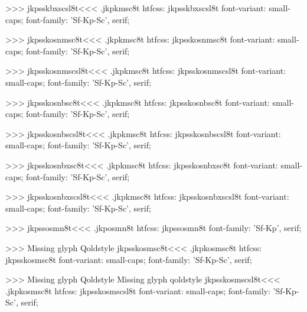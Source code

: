>>>
\<jkpsskbxscsl8t\><<<
.jkpkmsc8t
htfcss:  jkpsskbxscsl8t  font-variant: small-caps; font-family: 'Sf-Kp-Sc', serif;

>>>
\<jkpsskosnmsc8t\><<<
.jkpkmsc8t
htfcss:  jkpsskosnmsc8t  font-variant: small-caps; font-family: 'Sf-Kp-Sc', serif;

>>>
\<jkpsskosnmscsl8t\><<<
.jkpkmsc8t
htfcss:  jkpsskosnmscsl8t  font-variant: small-caps; font-family: 'Sf-Kp-Sc', serif;

>>>
\<jkpsskosnbsc8t\><<<
.jkpkmsc8t
htfcss:  jkpsskosnbsc8t  font-variant: small-caps; font-family: 'Sf-Kp-Sc', serif;

>>>
\<jkpsskosnbscsl8t\><<<
.jkpkmsc8t
htfcss:  jkpsskosnbscsl8t  font-variant: small-caps; font-family: 'Sf-Kp-Sc', serif;

>>>
\<jkpsskosnbxsc8t\><<<
.jkpkmsc8t
htfcss:  jkpsskosnbxsc8t  font-variant: small-caps; font-family: 'Sf-Kp-Sc', serif;

>>>
\<jkpsskosnbxscsl8t\><<<
.jkpkmsc8t
htfcss:  jkpsskosnbxscsl8t  font-variant: small-caps; font-family: 'Sf-Kp-Sc', serif;

>>>
\<jkpssosmn8t\><<<
.jkposmn8t
htfcss:  jkpssosmn8t  font-family: 'Sf-Kp', serif;

>>>
Missing glyph	Qoldstyle
\<jkpsskosmsc8t\><<<
.jkpkosmsc8t
htfcss:  jkpsskosmsc8t  font-variant: small-caps; font-family: 'Sf-Kp-Sc', serif;

>>>
Missing glyph	Qoldstyle
Missing glyph	qoldstyle
\<jkpsskosmscsl8t\><<<
.jkpkosmsc8t
htfcss:  jkpsskosmscsl8t  font-variant: small-caps; font-family: 'Sf-Kp-Sc', serif;

